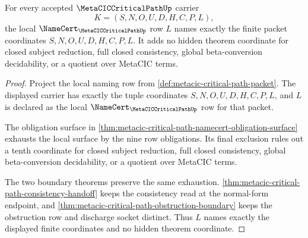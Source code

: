 \begin{theorem}
\label{thm:metacic-critical-path-local-naming-exhaustion}
For every accepted $\MetaCICCriticalPathUp$ carrier
$$
K=(S,N,O,U,D,H,C,P,L),
$$
the local $\NameCert_{\MetaCICCriticalPathUp}$ row $L$ names exactly the finite packet coordinates $S,N,O,U,D,H,C,P,L$. It adds no hidden theorem coordinate for closed subject reduction, full closed consistency, global beta-conversion decidability, or a quotient over MetaCIC terms.
\end{theorem}
\begin{proof}
Project the local naming row from \autoref{def:metacic-critical-path-packet}. The displayed carrier has exactly the tuple coordinates $S,N,O,U,D,H,C,P,L$, and $L$ is declared as the local $\NameCert_{\MetaCICCriticalPathUp}$ row for that packet.

The obligation surface in \autoref{thm:metacic-critical-path-namecert-obligation-surface} exhausts the local surface by the nine row obligations. Its final exclusion rules out a tenth coordinate for closed subject reduction, full closed consistency, global beta-conversion decidability, or a quotient over MetaCIC terms.

The two boundary theorems preserve the same exhaustion. \autoref{thm:metacic-critical-path-consistency-handoff} keeps the consistency read at the normal-form endpoint, and \autoref{thm:metacic-critical-path-obstruction-boundary} keeps the obstruction row and discharge socket distinct. Thus $L$ names exactly the displayed finite coordinates and no hidden theorem coordinate.
\end{proof}

